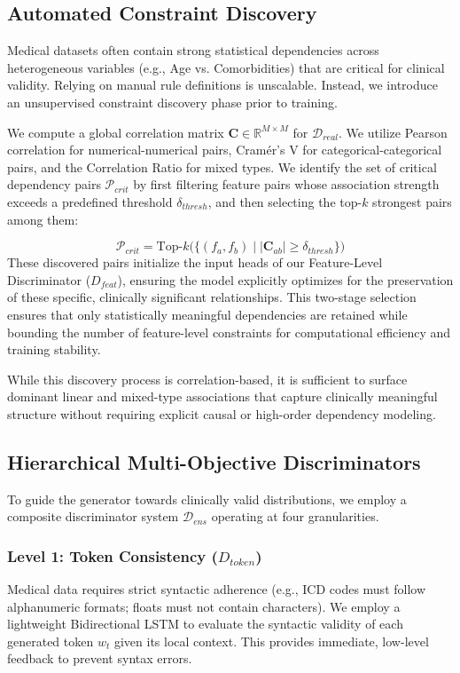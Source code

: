 \subsection{Automated Constraint Discovery}
Medical datasets often contain strong statistical dependencies across heterogeneous variables (e.g., Age vs. Comorbidities) that are critical for clinical validity.
Relying on manual rule definitions is unscalable. Instead, we introduce an unsupervised constraint discovery phase prior to training.

We compute a global correlation matrix $\mathbf{C} \in \mathbb{R}^{M \times M}$ for $\mathcal{D}_{real}$. We utilize Pearson correlation for numerical-numerical pairs, Cramér's V for categorical-categorical pairs, and the Correlation Ratio for mixed types.
We identify the set of critical dependency pairs $\mathcal{P}_{crit}$ by first filtering feature pairs whose association strength exceeds a predefined threshold $\delta_{thresh}$, and then selecting the top-$k$ strongest pairs among them:


\begin{equation}
    \mathcal{P}_{crit} = \text{Top-}k \Big( \{ (f_a, f_b) \mid |\mathbf{C}_{ab}| \geq \delta_{thresh} \} \Big)
\end{equation}
These discovered pairs initialize the input heads of our Feature-Level Discriminator ($D_{feat}$), ensuring the model explicitly optimizes for the preservation of these specific, clinically significant relationships.
This two-stage selection ensures that only statistically meaningful dependencies are retained while bounding the number of feature-level constraints for computational efficiency and training stability.


While this discovery process is correlation-based, it is sufficient to surface dominant linear and mixed-type associations that capture clinically meaningful structure without requiring explicit causal or high-order dependency modeling.


\subsection{Hierarchical Multi-Objective Discriminators}
To guide the generator towards clinically valid distributions, we employ a composite discriminator system $\mathcal{D}_{ens}$ operating at four granularities.


\subsubsection{Level 1: Token Consistency ($D_{token}$)}
Medical data requires strict syntactic adherence (e.g., ICD codes must follow alphanumeric formats; floats must not contain characters). We employ a lightweight Bidirectional LSTM to evaluate the syntactic validity of each generated token $w_t$ given its local context. This provides immediate, low-level feedback to prevent syntax errors.


